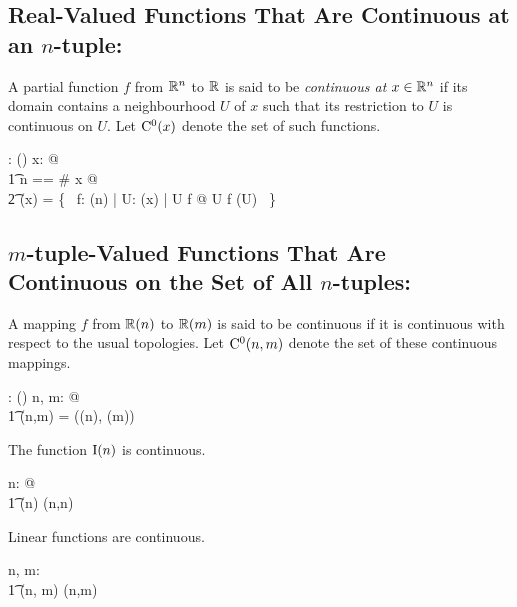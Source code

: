 \documentclass[11pt, oneside]{article}
\begin{document}
\subsection{Real-Valued Functions That Are Continuous at an $n$-tuple: }

A partial function $f$ from $\mathbb{R}^n$ to $\mathbb{R}$ is said to be \textit{continuous at} $x \in \mathbb{R}^n$ if its domain contains a neighbourhood $U$ of $x$
such that its restriction to $U$ is continuous on $U$.
Let $\operatorname{C^0}(x)$ denote the set of such functions.

\begin{axdef}
	\CzeroPointRtup: \Rinf \fun \power(\Rinf \pfun \R)
\where
	\forall x: \Rinf @ \\
	\t1	\LET n == \# x @ \\
	\t2		\CzeroPointRtup(x) = \{~ f: \Rtup(n) \pfun \R | \exists U: \neighRinf(x) | U \subseteq \dom f @ U \dres f \in \CzeroSubsetRtup(U) ~\}
\end{axdef}

\subsection{$m$-tuple-Valued Functions That Are Continuous on the Set of All $n$-tuples: }

A mapping $f$ from $\operatorname{\mathbb{R}}(n)$ to $\operatorname{\mathbb{R}}(m)$ is said to be continuous if it is continuous with respect to the usual topologies.
Let $\operatorname{C^0}(n,m)$ denote the set of these continuous mappings.

\begin{axdef}
	\CzeroRtupRtup: \nat \cross \nat \fun \power(\Rinf \pfun \Rinf)
\where
	\forall n, m: \nat @ \\
	\t1	\CzeroRtupRtup(n,m) = \CzeroTT(\tsRtup(n), \tsRtup(m))
\end{axdef}

\begin{example}
The function $\operatorname{I}(n)$ is continuous.

\begin{zed}
	\forall n: \nat @ \\
	\t1	\idRtup(n) \in \CzeroRtupRtup(n,n)
\end{zed}

\begin{theorem}
Linear functions are continuous.

\begin{zed}
	\forall n, m: \nat@ \\
	\t1	\linRtup(n, m) \subseteq \CzeroRtupRtup(n,m)
\end{zed}

\end{theorem}

\end{example}
\end{document}
